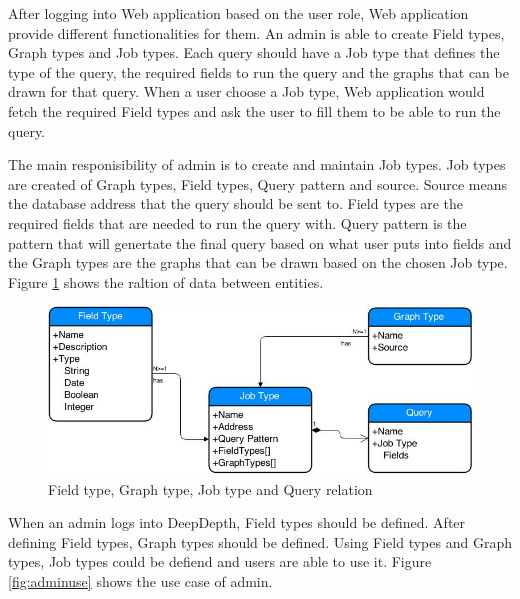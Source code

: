 \documentclass[a4paper,11pt]{report}
\begin{document}
After logging into Web application based on the user role, Web application provide different functionalities for them. An admin is able to create Field types, Graph types and Job types. Each query should have a Job type that defines the type of the query, the required fields to run the query and the graphs that can be drawn for that query. When a user choose a Job type, Web application would fetch the required Field types and ask the user to fill them to be able to run the query.

The main responisibility of admin is to create and maintain Job types. Job types are created of Graph types, Field types, Query pattern and source. Source means the database address that the query should be sent to. Field types are the required fields that are needed to run the query with. Query pattern is the pattern that will genertate the final query based on what user puts into fields and the Graph types are the graphs that can be drawn based on the chosen Job type. Figure \ref{fig:datarelation} shows the raltion of data between entities.

\begin{figure}[!ht]
\begin{center}
\includegraphics[scale=0.5]{datarelation.jpg}
\end{center}
\caption{Field type, Graph type, Job type and Query relation}
\label{fig:datarelation}
\end{figure}

When an admin logs into DeepDepth, Field types should be defined. After defining Field types, Graph types should be defined. Using Field types and Graph types, Job types could be defiend and users are able to use it. Figure \ref{fig:adminuse} shows the use case of admin.
\end{document}
